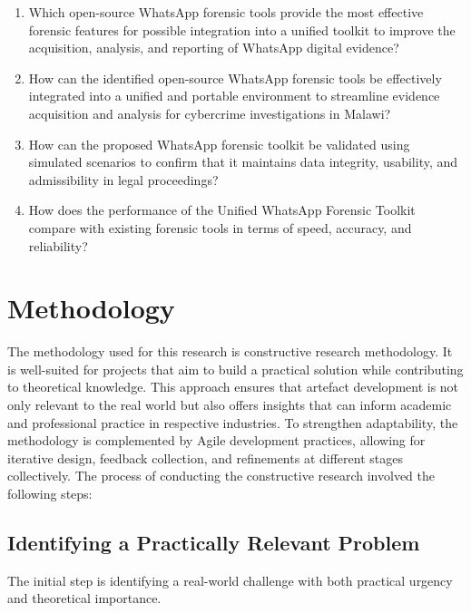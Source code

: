 \documentclass[12pt,a4paper]{report}
\begin{document}
\begin{enumerate}
    \item Which open-source WhatsApp forensic tools provide the most effective forensic features for possible integration into a unified toolkit to improve the acquisition, analysis, and reporting of WhatsApp digital evidence?

    \item How can the identified open-source WhatsApp forensic tools be effectively integrated into a unified and portable environment to streamline evidence acquisition and analysis for cybercrime investigations in Malawi?

    \item How can the proposed WhatsApp forensic toolkit be validated using simulated scenarios to confirm that it maintains data integrity, usability, and admissibility in legal proceedings?

    \item How does the performance of the Unified WhatsApp Forensic Toolkit compare with existing forensic tools in terms of speed, accuracy, and reliability?
\end{enumerate}

\section{Methodology}

The methodology used for this research is constructive research methodology. It is well-suited for projects that aim to build a practical solution while contributing to theoretical knowledge. This approach ensures that artefact development is not only relevant to the real world but also offers insights that can inform academic and professional practice in respective industries. To strengthen adaptability, the methodology is complemented by Agile development practices, allowing for iterative design, feedback collection, and refinements at different stages collectively. The process of conducting the constructive research involved the following steps:

\subsection{Identifying a Practically Relevant Problem}

The initial step is identifying a real-world challenge with both practical urgency and theoretical importance.
\end{document}

